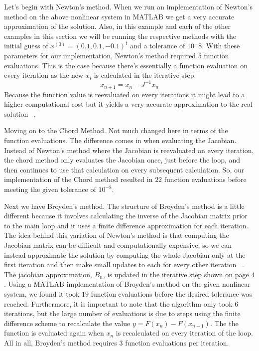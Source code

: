\documentclass[paper=a4, fontsize=11pt]{scrartcl} %
\numberwithin{equation}{section} %
\numberwithin{figure}{section} %
\numberwithin{table}{section} %
\begin{document}
\indent Let's begin with Newton's method.  When we run an implementation of Newton's method on the above nonlinear system in MATLAB we get a very accurate approximation of the solution.  Also, in this example and each of the other examples in this section we will be running the respective methods with the initial guess of $x^{(0)} = (0.1,0.1,-0.1)^t$ and a tolerance of $10^-8$.  With these parameters for our implementation, Newton's method required $5$ function evaluations.  This is the case because there's essentially a function evaluation on every iteration as the new $x_i$ is calculated in the iterative step: $$x_{n+1} = x_n - J^{-1}x_n$$
Because the function value is reevaluated on every iterations it might lead to a higher computational cost but it yields a very accurate approximation to the real solution ~\cite{online1}.  

\bigskip

\indent Moving on to the Chord Method.  Not much changed here in terms of the function evaluations.  The difference comes in when evaluating the Jacobian.  Instead of Newton's method where the Jacobian is reevaluated on every iteration, the chord method only evaluates the Jacobian once, just before the loop, and then continues to use that calculation on every subsequent calculation.  So, our implementation of the Chord method resulted in $22$ function evaluations before meeting the given tolerance of $10^{-8}$.  

\bigskip

\indent Next we have Broyden's method.  The structure of Broyden's method is a little different because it involves calculating the inverse of the Jacobian matrix prior to the main loop and it uses a finite difference approximation for each iteration.  The idea behind this variation of Newton's method is that computing the Jacobian matrix can be difficult and computationally expensive, so we can instead approximate the solution by computing the whole Jacobian only at the first iteration and then make small updates to each for every other iteration ~\cite{online1}.  The jacobian approximation, $B_n$, is updated in the iterative step shown on page $4$.  Using a MATLAB implementation of Broyden's method on the given nonlinear system, we found it took $19$ function evaluations before the desired tolerance was reached.  Furthermore, it is important to note that the algorithm only took $6$ iterations, but the large number of evaluations is due to steps using the finite difference scheme to recalculate the value $y = F(x_n) - F(x_{n-1})$.  The the function is evaluated again when $x_n$ is recalculated on every iteration of the loop.  All in all, Broyden's method requires $3$ function evaluations per iteration.  
\end{document}
